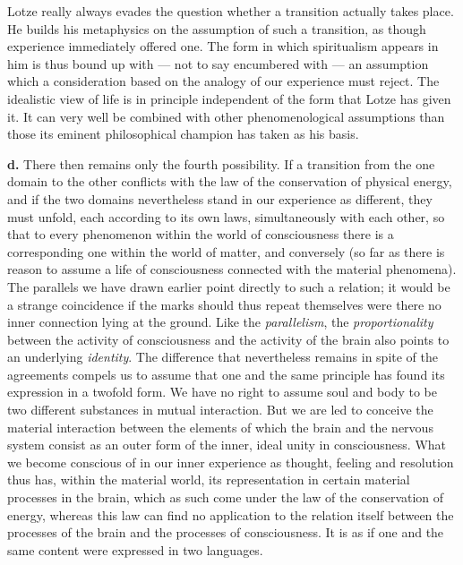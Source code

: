 \documentclass[12pt,a4paper]{book}
\newcommand{\opage}[1]{\marginnote{\footnotesize\textit{[#1]}}}
\begin{document}
Lotze really always evades the question whether a transition actually
takes place. He builds his metaphysics on the assumption of such a
transition, as though experience immediately offered one. The form in
which spiritualism appears in him is thus bound up with --- not to say
encumbered with --- an assumption which a consideration based on the
analogy of our experience must reject. The idealistic view of life is in
principle independent of the form that Lotze has given it. It can very
well be combined with other phenomenological assumptions than those its
eminent philosophical champion has taken as his basis.

\textbf{d.} There then remains only the fourth possibility. If a
transition from the one domain to the other conflicts with the law of
the conservation of physical energy, and if the two domains nevertheless
stand in our experience as different, they must unfold, each according
to its own laws, simultaneously with each other, so that to every
phenomenon within the world of consciousness
\opage{77}there is a corresponding one within the world of matter, and
conversely (so far as there is reason to assume a life of consciousness
connected with the material phenomena). The parallels we have drawn
earlier point directly to such a relation; it would be a strange
coincidence if the marks should thus repeat themselves were there no
inner connection lying at the ground. Like the \emph{parallelism}, the
\emph{proportionality} between the activity of consciousness and the
activity of the brain also points to an underlying \emph{identity}. The
difference that nevertheless remains in spite of the agreements compels
us to assume that one and the same principle has found its expression in
a twofold form. We have no right to assume soul and body to be two
different substances in mutual interaction. But we are led to conceive
the material interaction between the elements of which the brain and
the nervous system consist as an outer form of the inner, ideal unity in
consciousness. What we become conscious of in our inner experience as
thought, feeling and resolution thus has, within the material world,
its representation in certain material processes in the brain, which as
such come under the law of the conservation of energy, whereas this law
can find no application to the relation itself between the processes of
the brain and the processes of consciousness. It is as if one and the
same content were expressed in two languages.
\end{document}
